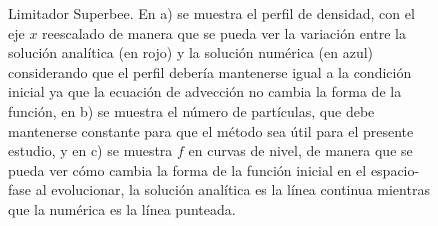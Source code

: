 \documentclass[11pt,twoside,openright,spanish]{report}
\numberwithin{equation}{chapter}
\numberwithin{figure}{chapter}
\numberwithin{table}{chapter}
\begin{document}
\begin{figure}[p]
	\caption{Limitador Superbee. En a) se muestra el perfil de densidad, con el eje $x$ reescalado de manera que se pueda ver la variación entre la solución analítica (en rojo) y la solución numérica (en azul) considerando que el perfil debería mantenerse igual a la condición inicial ya que la ecuación de advección no cambia la forma de la función, en b) se muestra el número de partículas, que debe mantenerse constante para que el método sea útil para el presente estudio, y en c) se muestra $f$ en curvas de nivel, de manera que se pueda ver cómo cambia la forma de la función inicial en el espacio-fase al evolucionar, la solución analítica es la línea continua mientras que la numérica es la línea punteada.}
	\label{superbee}
\end{figure}
\end{document}

